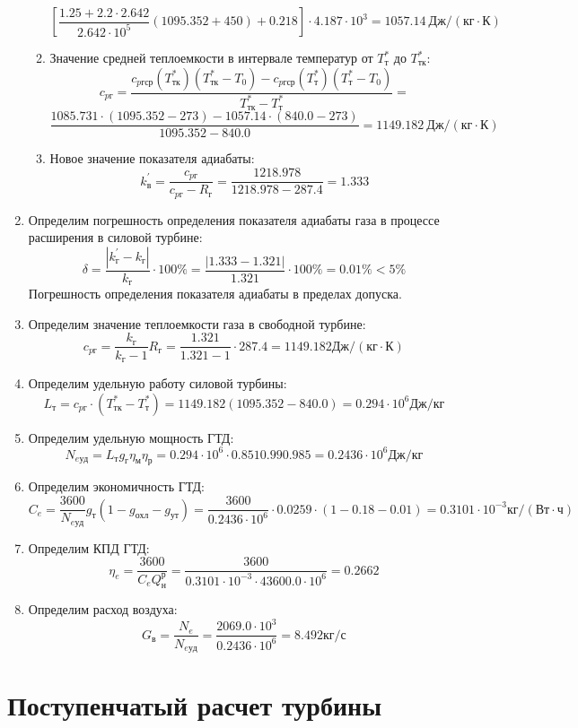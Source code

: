 \documentclass[a4paper,10pt]{article}
\begin{document}
\begin{enumerate}
\begin{enumerate}
	\[\left[ 
	\frac{1.25 +2.2 \cdot 2.642}{2.642 \cdot 10^5} (1095.352 + 450) + 0.218
	\right] \cdot 4.187 \cdot 10^3= 1057.14\ Дж / (кг \cdot К) \]
	\item Значение средней теплоемкости в интервале температур от $T_{т}^*$ до $T_{тк}^*$:
	\[c_{pг} = \frac{
	c_{pг ср}(T_{тк}^*) (T_{тк}^* - T_0) - c_{pг ср}(T_{т}^*)(T_{т}^* - T_0)
	}{
	T_{тк}^* - T_{т}^*} = \]
	\[\frac{
	1085.731 \cdot (1095.352 - 273) - 1057.14 \cdot (840.0 - 273)
	}{
	1095.352 - 840.0} = 1149.182\ Дж / (кг \cdot К)\]
	\item Новое значение показателя адиабаты:
	\[k_в^\prime = \frac{c_{pг}}{c_{pг} - R_г} = \frac{1218.978}{1218.978 - 287.4} = 1.333\]
	\end{enumerate}	 

	\item Определим погрешность определения показателя адиабаты газа в процессе расширения в силовой турбине:
	$$\delta = \frac{\left| k_г^\prime - k_г \right|}{k_г} \cdot 100 \% = 
	\frac{\left| 1.333 - 1.321 \right|}{1.321} \cdot 100 \% = 
	0.01 \% < 5 \%$$
	Погрешность определения показателя адиабаты в пределах допуска.
	\item Определим значение теплоемкости газа в свободной турбине:
	$$c_{pг} = \frac{k_г}{k_г - 1} R_г = 
	\frac{1.321}{1.321 - 1} \cdot 287.4 = 1149.182 Дж/(кг \cdot К)$$
	\item Определим удельную работу силовой турбины:
	$$L_т = c_{pг} \cdot \left( T_{тк}^* - T_т^* \right) = 
	1149.182 \left( 1095.352 - 840.0 \right) = 
	0.294 \cdot 10^6 Дж/кг$$
	\item Определим удельную мощность ГТД:
	$$N_{e уд} = L_т g_г \eta_м \eta_р = 
	0.294 \cdot 10^6 \cdot 0.851 0.99 0.985 = 
	0.2436 \cdot 10^6 Дж/кг$$
	\item Определим экономичность ГТД:
	$$C_e = \frac{3600}{N_{e уд}} g_т \left(1 - g_{охл}
	- g_{ут}\right) = 
	\frac{3600}{0.2436 \cdot 10^6} \cdot 0.0259 \cdot \left(1 - 0.18
	- 0.01\right) = 
	0.3101 \cdot 10^{-3} кг/\left( Вт \cdot ч \right)$$
	\item Определим КПД ГТД:
	$$\eta_e = \frac{3600}{C_e Q_н^р} = 
	\frac{3600}{0.3101 \cdot 10^{-3} \cdot 43600.0 \cdot 10^6} 
	= 0.2662$$
	\item Определим расход воздуха:
	$$G_в = \frac{N_e}{N_{e уд} } = 
	\frac{2069.0 \cdot 10^3}{0.2436 \cdot 10^6 } = 
	8.492 кг/с$$
\end{enumerate}


\section{Поступенчатый расчет турбины}
\end{document}
